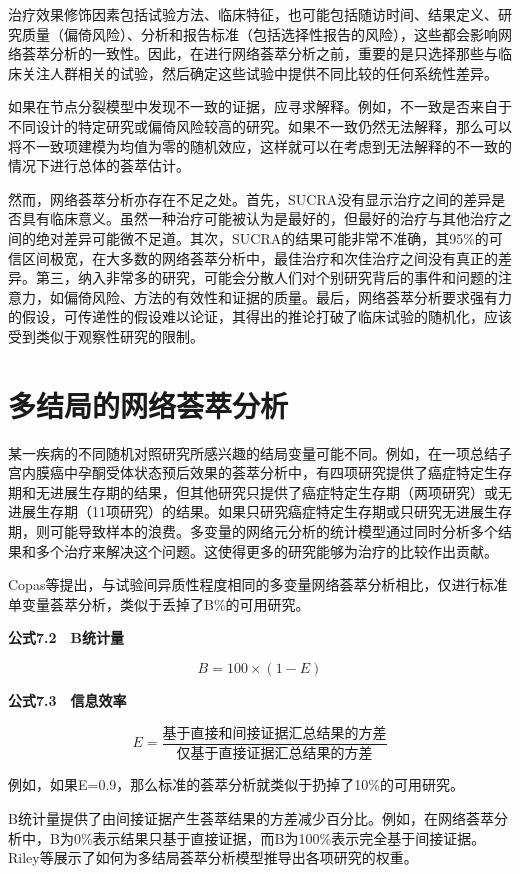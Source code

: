 \documentclass[
  chinese-hans,
  letterpaper,
  DIV=11,
  numbers=noendperiod]{scrreprt}
\begin{document}
治疗效果修饰因素包括试验方法、临床特征，也可能包括随访时间、结果定义、研究质量（偏倚风险）、分析和报告标准（包括选择性报告的风险），这些都会影响网络荟萃分析的一致性。因此，在进行网络荟萃分析之前，重要的是只选择那些与临床关注人群相关的试验，然后确定这些试验中提供不同比较的任何系统性差异。

如果在节点分裂模型中发现不一致的证据，应寻求解释。例如，不一致是否来自于不同设计的特定研究或偏倚风险较高的研究。如果不一致仍然无法解释，那么可以将不一致项建模为均值为零的随机效应，这样就可以在考虑到无法解释的不一致的情况下进行总体的荟萃估计。

然而，网络荟萃分析亦存在不足之处。首先，SUCRA没有显示治疗之间的差异是否具有临床意义。虽然一种治疗可能被认为是最好的，但最好的治疗与其他治疗之间的绝对差异可能微不足道。其次，SUCRA的结果可能非常不准确，其95\%的可信区间极宽，在大多数的网络荟萃分析中，最佳治疗和次佳治疗之间没有真正的差异。第三，纳入非常多的研究，可能会分散人们对个别研究背后的事件和问题的注意力，如偏倚风险、方法的有效性和证据的质量。最后，网络荟萃分析要求强有力的假设，可传递性的假设难以论证，其得出的推论打破了临床试验的随机化，应该受到类似于观察性研究的限制。

\section{多结局的网络荟萃分析}\label{ux591aux7ed3ux5c40ux7684ux7f51ux7edcux835fux8403ux5206ux6790}

某一疾病的不同随机对照研究所感兴趣的结局变量可能不同。例如，在一项总结子宫内膜癌中孕酮受体状态预后效果的荟萃分析中，有四项研究提供了癌症特定生存期和无进展生存期的结果，但其他研究只提供了癌症特定生存期（两项研究）或无进展生存期（11项研究）的结果。如果只研究癌症特定生存期或只研究无进展生存期，则可能导致样本的浪费。多变量的网络元分析的统计模型通过同时分析多个结果和多个治疗来解决这个问题。这使得更多的研究能够为治疗的比较作出贡献。

Copas等提出，与试验间异质性程度相同的多变量网络荟萃分析相比，仅进行标准单变量荟萃分析，类似于丢掉了B\%的可用研究。

\textbf{公式7.2　B统计量}

\[B = 100\times(1 - E)\]

\textbf{公式7.3　信息效率}

\[E = \frac{\text{基于直接和间接证据汇总结果的方差}}{\text{仅基于直接证据汇总结果的方差}}\]

例如，如果E=0.9，那么标准的荟萃分析就类似于扔掉了10\%的可用研究。

B统计量提供了由间接证据产生荟萃结果的方差减少百分比。例如，在网络荟萃分析中，B为0\%表示结果只基于直接证据，而B为100\%表示完全基于间接证据。Riley等展示了如何为多结局荟萃分析模型推导出各项研究的权重。
\end{document}
